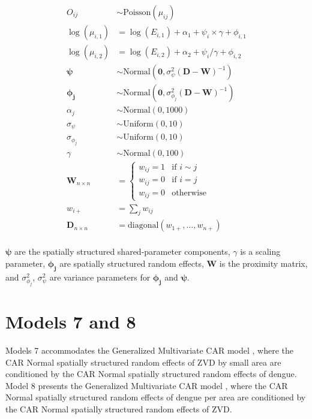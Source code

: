 \documentclass[10pt,letterpaper]{article}
\begin{document}
\begin{align*}
O_{ij}           &\sim   \mbox{Poisson}(\mu_{ij})\\
\log(\mu_{i,1}) &=      \log(E_{i,1}) + \alpha_{1} + \psi_{i} \times \gamma + \phi_{i,1}\\
\log(\mu_{i,2}) &=      \log(E_{i,2}) + \alpha_{2} + \psi_{i} / \gamma      + \phi_{i,2}\\
\boldsymbol{\psi} &\sim   \mbox{Normal}(\mathbf{0}, \sigma^{2}_{\psi}(\boldsymbol{D}-\boldsymbol{W})^{-1})\\ 
\boldsymbol{\phi_{j}}     &\sim   \mbox{Normal}(\mathbf{0}, \sigma^{2}_{\phi_{j}}(\boldsymbol{D}-\boldsymbol{W})^{-1})\\
\alpha_{j}        &\sim   \mbox{Normal}(0,1000)\\
\sigma_{\psi}     &\sim   \mbox{Uniform}(0, 10)\\
\sigma_{\phi_{j}} &\sim   \mbox{Uniform}(0, 10)\\
\gamma            &\sim   \mbox{Normal}(0,100)\\
\boldsymbol{W}_{n \times n} &=
\left\{
\begin{array}{rl}
w_{ij} = 1 & \mbox{if } i \sim j \\
w_{ij} = 0 & \mbox{if } i = j    \\
w_{ij} = 0 & \mbox{otherwise}   
\end{array}
\right.\\
w_{i+}                      &=\sum_{j} w_{ij}\\
\boldsymbol{D}_{n \times n} &=\mbox{diagonal}(w_{1+},\dots,w_{n+})\\
\end{align*}

$\boldsymbol{\psi}$ are the spatially structured shared-parameter components, $\gamma$ is a scaling parameter, $\boldsymbol{\phi_{j}}$ are spatially structured random effects, $\boldsymbol{W}$ is the proximity matrix, and $\sigma^{2}_{\phi_{j}}$, $\sigma^{2}_{\psi}$ are variance parameters for $\boldsymbol{\phi_{j}}$ and $\boldsymbol{\psi}$.

\newpage

\section*{Models 7 and 8}
Models 7 accommodates the Generalized Multivariate CAR model \cite{Jin2005}, where the CAR Normal spatially structured random effects of ZVD by small area are conditioned by the CAR Normal spatially structured random effects of dengue.  Model 8 presents the Generalized Multivariate CAR model \cite{Jin2005}, where the CAR Normal spatially structured random effects of dengue per area are conditioned by the CAR Normal spatially structured random effects of ZVD. 
\end{document}
